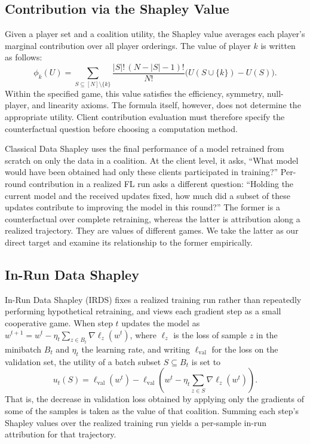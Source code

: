 \documentclass[letterpaper]{article} %
\theoremstyle{definition} %
\newcommand{\lval}{\ell_{\mathrm{val}}}
\begin{document}
\subsection{Contribution via the Shapley Value}
\label{sec:datashapley}

Given a player set and a coalition utility, the Shapley value averages each
player's marginal contribution over all player orderings. The value of
player $k$ is written as follows:
\begin{equation}
\label{eq:shapley}
\phi_k(U)
= \sum_{S \subseteq [N]\setminus\{k\}}
\frac{|S|!\,(N{-}|S|{-}1)!}{N!}
\bigl(U(S\cup\{k\})-U(S)\bigr).
\end{equation}
Within the specified game, this value satisfies the efficiency, symmetry,
null-player, and linearity axioms. The formula itself, however, does not
determine the appropriate utility. Client contribution evaluation must
therefore specify the counterfactual question before choosing a computation
method.

Classical Data Shapley uses the final performance of a model retrained from
scratch on only the data in a coalition. At the client level, it asks, ``What
model would have been obtained had only these clients participated in
training?'' Per-round contribution in a realized FL run asks a different
question: ``Holding the current model and the received updates fixed, how much
did a subset of these updates contribute to improving the model in this
round?'' The former is a counterfactual over complete retraining, whereas the
latter is attribution along a realized trajectory. They are values of
different games. We take the latter as our direct target and examine its
relationship to the former empirically.

\subsection{In-Run Data Shapley}
\label{sec:irds}

In-Run Data Shapley (IRDS) fixes a realized training run
rather than repeatedly performing hypothetical retraining, and views each
gradient step as a small cooperative game. When step $t$ updates the model as
$w^{t+1}=w^t-\eta_t\sum_{z\in B_t}\nabla\ell_z(w^t)$, where $\ell_z$ is the
loss of sample $z$ in the minibatch $B_t$ and $\eta_t$ the learning rate, and
writing $\lval$ for the loss on the validation set,
the utility of a batch subset $S\subseteq B_t$ is set to
\begin{equation}
\label{eq:irds-utility}
u_t(S)
= \lval(w^t)
- \lval\left(
w^t-\eta_t\textstyle\sum_{z\in S}\nabla\ell_z(w^t)
\right).
\end{equation}
That is, the decrease in validation loss obtained by applying only the
gradients of some of the samples is taken as the value of that coalition.
Summing each step's Shapley values over the realized training run yields a
per-sample in-run attribution for that trajectory.
\end{document}
